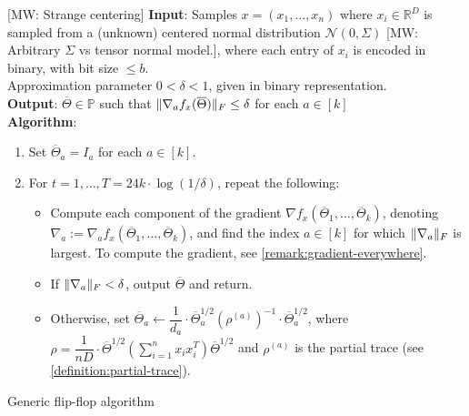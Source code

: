 \documentclass[aos]{imsart}
\theoremstyle{definition}
\numberwithin{equation}{section}
\DeclarePairedDelimiter{\norm}{\lVert}{\rVert}
\newcommand{\R}{{\mathbb{R}}}
\newcommand{\otheta}{\overline{\Theta}}
\newcommand{\eps}{\varepsilon}
\newcommand{\cN}{\mathcal{N}}
\newcommand{\SPD}{\mathbb{P}}
\newcommand{\samp}{x}
\def\dmax{d_{\max}}
\newcommand{\MW}[1]{{\color{red}[MW: #1]}}
\newcommand{\MW}[1]{{}}
\begin{document}
\begin{Algorithm}
\MW{Strange centering}
\textbf{Input}: Samples $\samp = (\samp_1, \ldots, \samp_n)$ where $\samp_i \in \R^D$ is sampled from a (unknown) centered normal distribution $\cN(0, \Sigma)$ \MW{Arbitrary $\Sigma$ vs tensor normal model.}, where each entry of $\samp_i$ is encoded in binary, with bit size $\le b$. \\ Approximation parameter $0 < \delta < 1$, given in binary representation. \\[.3ex]

\textbf{Output}: $\otheta \in \SPD$ such that $\norm{\nabla_a f_x(\otheta)}_F \leq \delta$ for each $a \in [k]$ \\[.3ex]

\textbf{Algorithm}:
\begin{enumerate}
\item\label{it:flip-flop step 1} Set $\otheta_a = I_a$ for each $a \in [k]$.

\vspace{5pt}

\item\label{it:flip-flop step 2} For $t=1,\dots,T = 24 k \cdot \log(1/\delta)$, repeat the following:

\vspace{5pt}

\begin{itemize}
\item Compute each component of the gradient $\nabla f_{\samp}(\otheta_1, \ldots, \otheta_k)$, denoting $\nabla_a := \nabla_a f_{\samp}(\otheta_1, \ldots, \otheta_k)$, and find the index $a \in [k]$ for which $\norm{\nabla_a}_F$ is largest. To compute the gradient, see \cref{remark:gradient-everywhere}.

\vspace{5pt}

\item
If $\norm{\nabla_a}_F < \delta$, output $\otheta$ and return.

\vspace{5pt}

\item Otherwise, set $\otheta_a \leftarrow  \dfrac{1}{d_a} \cdot \otheta_a^{1/2} (\rho^{(a)})^{-1} \cdot \otheta_a^{1/2}$, where $\rho = \dfrac{1}{nD} \cdot  \otheta^{1/2} \left( \sum_{i=1}^n x_ix_i^T \right) \otheta^{1/2}$ and $\rho^{(a)}$ is the partial trace (see \cref{definition:partial-trace}).
\end{itemize}
\end{enumerate}
\caption{Generic flip-flop algorithm}\label{alg:flip-flop}
\end{Algorithm}
\end{document}
